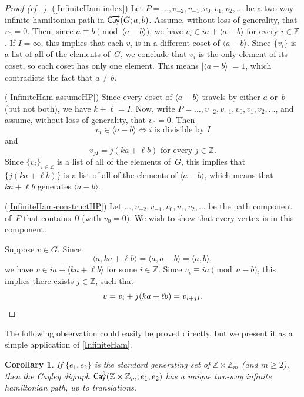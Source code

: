 \documentclass[11pt]{amsart}
\newtheorem{cor}[equation]{Corollary}
\theoremstyle{definition}
\numberwithin{case}{startcases}
\numberwithin{equation}{section}
\newcommand{\Z}{\mathbb{Z}}  %
\newcommand{\cayd}{\mathop{\mathsf{C}\mkern-1mu\overrightarrow{\mathsf{ay}}}}
\begin{document}
	\begin{proof}[Proof \upshape(cf.\ {\cite[Thm.~4]{Rankin})}]
		(\ref{InfiniteHam-index})
		Let $P = \ldots, v_{-2}, v_{-1}, v_0, v_1, v_2, \ldots$ be a two-way infinite hamiltonian path in $\cayd(G; a,b)$. Assume, without loss of generality, that $v_0 = 0$. Then, since $a \equiv b \pmod{\langle a - b \rangle}$, we have $v_i \in ia + \langle a - b \rangle$ for every $i \in \Z$. If $I = \infty$, this implies that each $v_i$ is in a different coset of $\langle a - b \rangle$. Since $\{v_i\}$ is a list of all of the elements of~$G$, we conclude that $v_i$ is the only element of its coset, so each coset has only one element. This means $|\langle a - b \rangle| = 1$, which contradicts the fact that $a \neq b$.
		
		(\ref{InfiniteHam-assumeHP})
		Since every coset of $\langle a - b \rangle$ travels by either $a$ or~$b$ (but not both), we have $k + \ell = I$. Now, write $P = \ldots, v_{-2}, v_{-1}, v_0, v_1, v_2, \ldots$, and assume, without loss of generality, that $v_0 = 0$. Then 
		\[ v_i \in \langle a - b \rangle \iff \text{$i$ is divisible by~$I$} \]
		and
		\[ \text{$v_{jI} = j(ka + \ell b)$ for every $j \in \Z$} . \]
		Since $\{v_i\}_{i \in \Z}$ is a list of all of the elements of~$G$, this implies that $\{j(ka + \ell b)\}$ is a list of all of the elements of $\langle a - b \rangle$, which means that $ka + \ell b$ generates $\langle a - b \rangle$.
		
		(\ref{InfiniteHam-constructHP})
		Let $\ldots, v_{-2}, v_{-1}, v_0, v_1, v_2, \ldots$ be the path component of~$P$ that contains~$0$ (with $v_0 = 0$). We wish to show that every vertex is in this component.
		
		Suppose $v \in G$. Since
		\[ \langle a, k a + \ell b \rangle
		= \langle a, a - b \rangle
		= \langle a, b \rangle, \]
		we have $v \in ia + \langle k a + \ell b \rangle$ for some $i \in \Z$. Since $v_i \equiv ia \pmod{a - b}$, this implies there exists $j \in \Z$, such that 
		\[ v = v_i + j(k a + \ell b) = v_{i + jI} . \qedhere \]
	\end{proof}
	
	The following observation could easily be proved directly, but we present it as a simple application of \cref{InfiniteHam}.
	
	\begin{cor} \label{ZxZm}
		If $\{e_1, e_2\}$ is the standard generating set of $\Z \times \Z_m$ \textup(and $m \ge 2$\textup), then the Cayley digraph\/ $\cayd(\Z \times \Z_m;e_1,e_2)$ has a unique two-way infinite hamiltonian path, up to translations.
	\end{cor}
	
\end{document}
